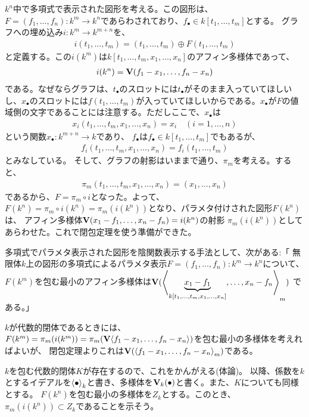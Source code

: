 $k^n$中で多項式で表示された図形を考える。この図形は、$F=(f_1,\dots,f_n)\colon k^m \to k^n$であらわされており、$f_\bullet \in k[t_1,\dots,t_m]$とする。
グラフへの埋め込み$i\colon k^m \to k^{m+n}$を、
\begin{align}
  i(t_1,\dots,t_m) = (t_1,\dots,t_m)\oplus F(t_1,\dots,t_m)
\end{align}
と定義する。この$i(k^m)$は$k[t_1,\dots,t_m,x_1,\dots,x_n]$のアフィン多様体であって、
\begin{align}
  i(k^n) = \textbf V(f_1-x_1,\dots,f_n-x_n)
\end{align}
である。なぜならグラフは、$t_\bullet$のスロットには$t_\bullet$がそのまま入っていてほしいし、$x_\bullet$のスロットには$f(t_1,\dots,t_m)$が入っていてほしいからである。$x_\bullet$が$F$の値域側の文字であることには注意する。ただしここで、$x_\bullet$は
\begin{align}
  x_i(t_1,\dots,t_m,x_1,\dots,x_n) = x_i \quad (i=1,\dots,n)
\end{align}
という関数$x_\bullet \colon k^{m+n} \to k$であり、
$f_\bullet$は$f_\bullet \in k[t_1,\dots,t_m]$でもあるが、
\begin{align}
  f_i(t_1,\dots,t_m,x_1,\dots,x_n) = f_i(t_1,\dots,t_m)
\end{align}
とみなしている。
そして、グラフの射影はいままで通り、$\pi_m$を考える。すると、
\begin{align}
  \pi_m(t_1,\dots,t_m,x_1,\dots,x_n) = (x_1,\dots,x_n)
\end{align}
であるから、$F=\pi_m\circ i$となった。よって、$F(k^n) = \pi_m\circ i(k^n)=\pi_m(i(k^n))$となり、パラメタ付けされた図形$F(k^n)$は、
アフィン多様体$\textbf V(x_1-f_1,\dots,x_n-f_n)=i(k^n)$の射影
$\pi_m(i(k^n))$としてあらわせた。これで閉包定理を使う準備ができた。

多項式でパラメタ表示された図形を陰関数表示する手法として、次がある:「
無限体$k$上の図形の多項式によるパラメタ表示$F=(f_1,\dots,f_n)\colon k^m \to k^n$について、$F(k^m)$を包む最小のアフィン多様体は$\textbf V(\left\langle \underbrace{x_1-f_1}_{k[t_1,\dots,t_m,x_1,\dots,x_n]},\dots,x_n-f_n \right\rangle_m)$
である。」
\begin{myproof}
$k$が代数的閉体であるときには、$F(k^m) = \pi_m(i(k^m)) = \pi_m(\textbf V{\left\langle f_1-x_1,\dots,f_n-x_n \right\rangle})$を包む最小の多様体を考えればよいが、
閉包定理よりこれは$\textbf V(\left\langle f_1-x_1,\dots,f_n-x_n \right\rangle_m)$である。

$k$を包む代数的閉体$K$が存在するので、これをかんがえる(体論)。
以降、係数を$k$とするイデアルを$\left\langle \bullet \right\rangle_k$と書き、多様体を$\textbf V_k(\bullet)$と書く。また、$K$についても同様とする。
$F(k^n)$を包む最小の多様体を$Z_k$とする。このとき、$\pi_m(i(k^n)) \subset Z_k$であることを示そう。
\end{myproof}

